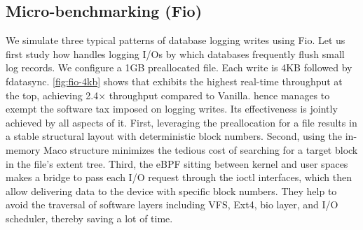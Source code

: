 
\subsection{Micro-benchmarking (Fio)}\label{sec:eval:path}
We simulate three typical patterns of database logging writes using Fio. %
Let us first study how \odes handles logging I/Os by which databases frequently flush  small log records.
 We configure a 1GB preallocated file. Each write is 4KB  followed by fdatasync. \autoref{fig:fio-4kb} shows that \odes exhibits the highest 
real-time throughput
  at the top,
  achieving  {2.4$\times$}  throughput
 compared to Vanilla.
 \odes hence manages to  exempt the software tax imposed on logging writes. Its  effectiveness %
 is jointly achieved by all aspects of it. First,
leveraging the preallocation for a file results in a stable structural layout with deterministic block numbers.
 Second,
 using the in-memory Maco structure %
  minimizes the tedious cost of searching for a target block in the file's extent tree.
 Third, the eBPF sitting between kernel and user spaces makes a bridge to pass
  each I/O request through the ioctl interfaces, which then allow delivering  data to the device with specific block numbers.
 They help to avoid the traversal of software layers including VFS, Ext4, bio layer, and I/O scheduler, thereby saving a lot of time.

